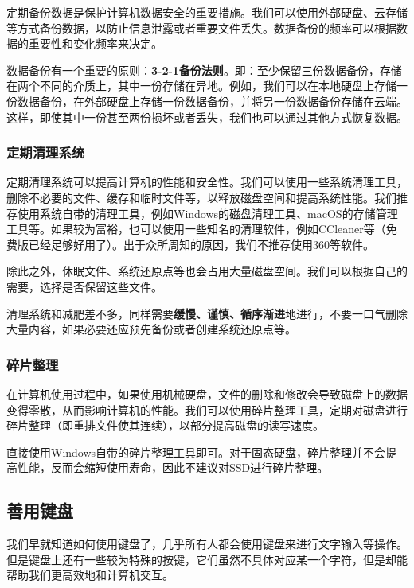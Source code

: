 定期备份数据是保护计算机数据安全的重要措施。我们可以使用外部硬盘、云存储等方式备份数据，以防止信息泄露或者重要文件丢失。数据备份的频率可以根据数据的重要性和变化频率来决定。

数据备份有一个重要的原则：\textbf{3-2-1备份法则}。即：至少保留三份数据备份，存储在两个不同的介质上，其中一份存储在异地。例如，我们可以在本地硬盘上存储一份数据备份，在外部硬盘上存储一份数据备份，并将另一份数据备份存储在云端。这样，即使其中一份甚至两份损坏或者丢失，我们也可以通过其他方式恢复数据。

\subsubsection{定期清理系统}

定期清理系统可以提高计算机的性能和安全性。我们可以使用一些系统清理工具，删除不必要的文件、缓存和临时文件等，以释放磁盘空间和提高系统性能。我们推荐使用系统自带的清理工具，例如Windows的磁盘清理工具、macOS的存储管理工具等。如果较为富裕，也可以使用一些知名的清理软件，例如CCleaner等（免费版已经足够好用了）。出于众所周知的原因，我们不推荐使用360等软件。

除此之外，休眠文件、系统还原点等也会占用大量磁盘空间。我们可以根据自己的需要，选择是否保留这些文件。

\begin{caution}
  清理系统和减肥差不多，同样需要\textbf{缓慢、谨慎、循序渐进}地进行，不要一口气删除大量内容，如果必要还应预先备份或者创建系统还原点等。
\end{caution}

\subsubsection{碎片整理}

在计算机使用过程中，如果使用机械硬盘，文件的删除和修改会导致磁盘上的数据变得零散，从而影响计算机的性能。我们可以使用碎片整理工具，定期对磁盘进行碎片整理（即重排文件使其连续），以部分提高磁盘的读写速度。

直接使用Windows自带的碎片整理工具即可。对于固态硬盘，碎片整理并不会提高性能，反而会缩短使用寿命，因此不建议对SSD进行碎片整理。

\subsection{善用键盘}

我们早就知道如何使用键盘了，几乎所有人都会使用键盘来进行文字输入等操作。但是键盘上还有一些较为特殊的按键，它们虽然不具体对应某一个字符，但是却能帮助我们更高效地和计算机交互。

